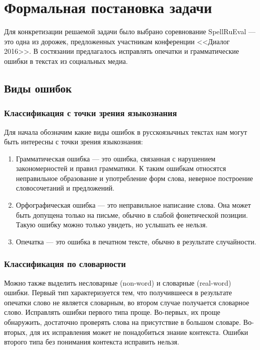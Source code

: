 \chapter{Формальная постановка задачи}

Для конкретизации решаемой задачи было выбрано соревнование SpellRuEval --- это одна из дорожек, предложенных участникам конференции <<Диалог 2016>>. В состязании предлагалось исправлять опечатки и грамматические ошибки в текстах из социальных медиа.

\section{Виды ошибок}

\subsection{Классификация с точки зрения языкознания}

Для начала обозначим какие виды ошибок в русскоязычных текстах нам могут быть интересны с точки зрения языкознания:
\begin{enumerate}
	\item Грамматическая ошибка --- это ошибка, связанная с нарушением закономерностей и правил грамматики. К таким ошибкам относятся неправильное образование и употребление форм слова, неверное построение словосочетаний и предложений. \cite{GrammarErrorDefinition}
	\item Орфографическая ошибка --- это неправильное написание слова. Она может быть допущена только на письме, обычно в слабой фонетической позиции. Такую ошибку можно только увидеть, но услышать ее нельзя.
	\item Опечатка --- это ошибка в печатном тексте, обычно в результате случайности.
\end{enumerate}

\subsection{Классификация по словарности}

Можно также выделить несловарные (non-word) и словарные (real-word) ошибки. Первый тип характеризуется тем, что получившееся в результате опечатки слово не является словарным, во втором случае получается словарное слово. Исправлять ошибки первого типа проще. Во-первых, их проще обнаружить, достаточно проверять слова на присутствие в большом словаре. Во-вторых, для их исправления может не понадобиться знание контекста. Ошибки второго типа без понимания контекста исправить нельзя.

